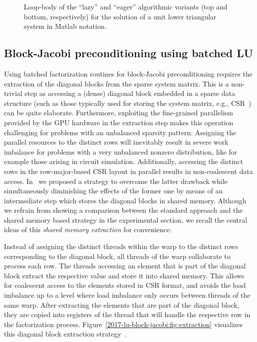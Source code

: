 \begin{figure}
\begin{center}
\begin{minipage}{0.9\columnwidth}
{\small

}
\end{minipage}
\begin{minipage}{0.9\columnwidth}
{\small

}
\end{minipage}
\caption{Loop-body of the ``lazy'' and ``eager'' algorithmic variants (top and bottom, respectively)
for the solution of a unit lower triangular system in Matlab notation.}
\label{2017-lu-block-jacobi:fig:trs}
\end{center}
\end{figure}

\subsection{Block-Jacobi preconditioning using batched LU}
Using batched factorization routines for block-Jacobi preconditioning
requires the extraction of the diagonal blocks from the sparse system matrix. 
This is a non-trivial step as accessing a (dense) diagonal block embedded in a 
sparse data structure (such as those typically used for storing the system matrix, e.g., CSR~\cite{saad})
can be quite elaborate. Furthermore, exploiting the fine-grained parallelism
provided by the GPU hardware in the extraction step makes this operation
challenging for problems with an unbalanced sparsity pattern:
Assigning the parallel resources to the distinct rows will inevitably result in severe
work imbalance for problems with a very unbalanced nonzero distribution, 
like for example those arising in circuit simulation.
Additionally, accessing the distinct rows in the row-major-based CSR layout in parallel
results in non-coalescent data access.
In~\cite{gje} we proposed a strategy to overcome the latter drawback while 
simultaneously diminishing the effects of the former one by means of 
an intermediate step which stores the diagonal blocks in shared memory.
Although we refrain 
from showing a comparison between the standard approach and the shared memory based
strategy in the experimental section, we recall the central ideas of this \textit{shared memory extraction} 
for convenience:


Instead of assigning the distinct threads within the warp to the distinct rows
corresponding to the diagonal block,
all threads of the warp collaborate to process each row.
The threads accessing an element that is part of the diagonal block extract the respective value
and store it into shared memory. This allows for coalescent access to the elements 
stored in CSR format, and avoids the load imbalance up to a level where load imbalance 
only occurs between threads of the same warp.
After extracting the elements that are part of the diagonal block,
they are copied into registers of the thread
that will handle the respective row in the factorization process.
Figure~\ref{2017-lu-block-jacobi:fig:extraction} visualizes this
diagonal block extraction strategy~\cite{gje}.


